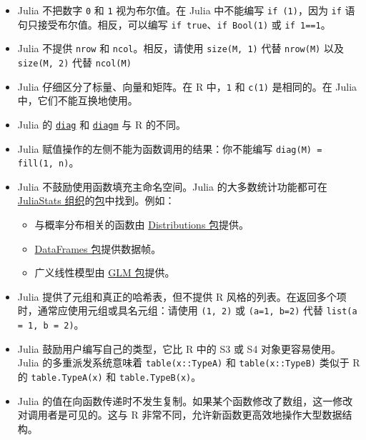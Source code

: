 \begin{itemize}
\item Julia 不把数字 \texttt{0} 和 \texttt{1} 视为布尔值。在 Julia 中不能编写 \texttt{if (1)}，因为 \texttt{if} 语句只接受布尔值。相反，可以编写 \texttt{if true}、\texttt{if Bool(1)} 或 \texttt{if 1==1}。


\item Julia 不提供 \texttt{nrow} 和 \texttt{ncol}。相反，请使用 \texttt{size(M, 1)} 代替 \texttt{nrow(M)} 以及 \texttt{size(M, 2)} 代替 \texttt{ncol(M)}


\item Julia 仔细区分了标量、向量和矩阵。在 R 中，\texttt{1} 和 \texttt{c(1)} 是相同的。在 Julia 中，它们不能互换地使用。


\item Julia 的 \hyperlink{17079356950356685026}{\texttt{diag}} 和 \hyperlink{18133091318829836689}{\texttt{diagm}} 与 R 的不同。


\item Julia 赋值操作的左侧不能为函数调用的结果：你不能编写 \texttt{diag(M) = fill(1, n)}。


\item Julia 不鼓励使用函数填充主命名空间。Julia 的大多数统计功能都可在 \href{https://github.com/JuliaStats}{JuliaStats 组织}的\href{https://pkg.julialang.org/}{包}中找到。例如：

\begin{itemize}
\item 与概率分布相关的函数由 \href{https://github.com/JuliaStats/Distributions.jl}{Distributions 包}提供。


\item \href{https://github.com/JuliaData/DataFrames.jl}{DataFrames 包}提供数据帧。


\item 广义线性模型由 \href{https://github.com/JuliaStats/GLM.jl}{GLM 包}提供。

\end{itemize}

\item Julia 提供了元组和真正的哈希表，但不提供 R 风格的列表。在返回多个项时，通常应使用元组或具名元组：请使用 \texttt{(1, 2)} 或 \texttt{(a=1, b=2)} 代替 \texttt{list(a = 1, b = 2)}。


\item Julia 鼓励用户编写自己的类型，它比 R 中的 S3 或 S4 对象更容易使用。Julia 的多重派发系统意味着 \texttt{table(x::TypeA)} 和 \texttt{table(x::TypeB)} 类似于 R 的 \texttt{table.TypeA(x)} 和 \texttt{table.TypeB(x)}。


\item Julia 的值在向函数传递时不发生复制。如果某个函数修改了数组，这一修改对调用者是可见的。这与 R 非常不同，允许新函数更高效地操作大型数据结构。



\end{itemize}

